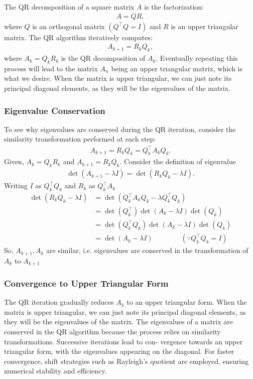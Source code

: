 \documentclass[12pt]{article}
\begin{document}
The QR decomposition of a square matrix $A$ is the factorization:
\begin{align*}
A = Q R,
\end{align*}
where $Q$ is an orthogonal matrix $(Q^{\top} Q = I)$ and $R$ is an upper triangular matrix. The QR algorithm iteratively computes:
\begin{align*}
A_{k+1} = R_k Q_k,
\end{align*}
where $A_k = Q_k R_k$ is the QR decomposition of $A_k$. 
Eventually repeating this process will lead to the matrix $A_n$ being an upper triangular matrix, which is what we desire. When the matrix is upper triangular, we can just note its principal diagonal elements, as they will be the eigenvalues of the matrix.
\subsubsection{Eigenvalue Conservation}

To see why eigenvalues are conserved during the QR iteration, consider the similarity transformation performed at each step:
\begin{align*}
A_{k+1} = R_k Q_k = Q_k^{\top} A_k Q_k.
\end{align*}
Given, $A_k = Q_k R_k$ and $A_{k+1} = R_k Q_k$. Consider the definition of eigenvalue
\begin{align*}
\det(A_{k+1} - \lambda I) = \det(R_k Q_k - \lambda I).
\end{align*}
Writing $I$ as $Q_k^{\top} Q_k$ and $R_k$ as $Q_k^{\top}A_k$
\begin{align*}
    \det(R_k Q_k - \lambda I)&=\det(Q_k^{\top}A_k Q_k - \lambda Q_k^{\top} Q_k)\\
    &= \det(Q_k^{\top})\det(A_k -\lambda I)\det(Q_k)\\
    &= \det(Q_k^{\top} Q_k)\det(A_k -\lambda I)\det(Q_k)\\
    &= \det(A_k -\lambda I)\quad \quad \quad \quad (\because Q_k^{\top}Q_k = I)
\end{align*}
So, $A_{k+1}, A_k$ are similar, i.e. eigenvalues are conserved in the transformation of $A_k$ to $A_{k+1}$

\subsubsection{Convergence to Upper Triangular Form}
The QR iteration gradually reduces $A_k$ to an upper triangular form. When the matrix is upper triangular, we can just note its principal diagonal elements, as they will be the eigenvalues of the matrix. The eigenvalues of a matrix are conserved in the QR algorithm because the
process relies on similarity transformations. Successive iterations lead to con-
vergence towards an upper triangular form, with the eigenvalues appearing on
the diagonal. For faster convergence, shift strategies such as Rayleigh’s quotient
are employed, ensuring numerical stability and efficiency.
\end{document}
